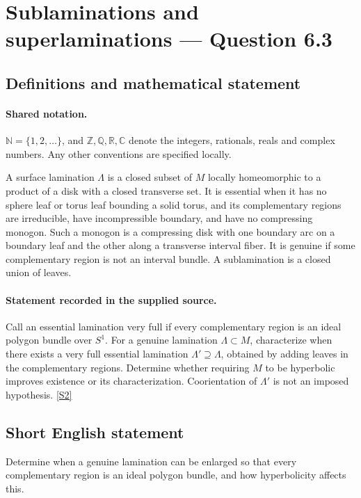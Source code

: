 \documentclass[11pt]{article}
\newcommand{\sref}[2]{\hyperlink{source:#1:#2}{[S#2]}}
\begin{document}
\section{Sublaminations and superlaminations — Question 6.3}\label{statement}

\subsection{Definitions and mathematical statement}

\paragraph{Shared notation.}$\mathbb N=\{1,2,\ldots\}$, and $\mathbb Z,\mathbb Q,\mathbb R,\mathbb C$ denote the integers, rationals, reals and complex numbers. Any other conventions are specified locally.


A surface lamination $\Lambda$ is a closed subset of $M$ locally homeomorphic to a product of a disk with a closed transverse set. It is essential when it has no sphere leaf or torus leaf bounding a solid torus, and its complementary regions are irreducible, have incompressible boundary, and have no compressing monogon. Such a monogon is a compressing disk with one boundary arc on a boundary leaf and the other along a transverse interval fiber. It is genuine if some complementary region is not an interval bundle. A sublamination is a closed union of leaves.
\paragraph{Statement recorded in the supplied source.}
Call an essential lamination very full if every complementary region is an ideal polygon bundle over $S^1$. For a genuine lamination $\Lambda\subset M$, characterize when there exists a very full essential lamination $\Lambda'\supseteq\Lambda$, obtained by adding leaves in the complementary regions. Determine whether requiring $M$ to be hyperbolic improves existence or its characterization. Coorientation of $\Lambda'$ is not an imposed hypothesis. \sref{statement}{2}
\subsection{Short English statement}
Determine when a genuine lamination can be enlarged so that every complementary region is an ideal polygon bundle, and how hyperbolicity affects this.
\end{document}
